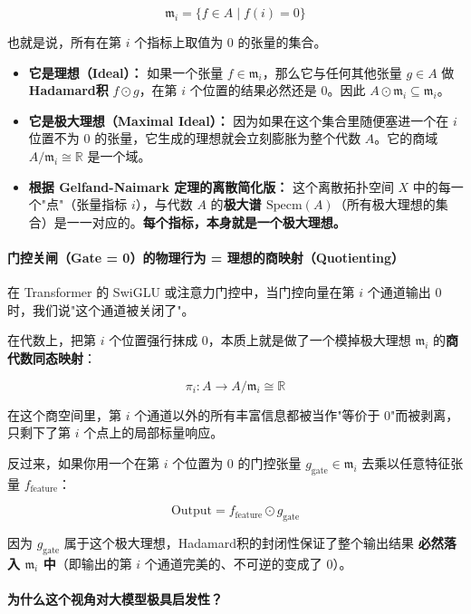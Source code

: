 \documentclass[10pt,a4paper]{article}
\begin{document}
\[
\mathfrak{m}_i = \{ f \in A \mid f(i) = 0 \}
\]

也就是说，所有在第 $i$ 个指标上取值为 $0$ 的张量的集合。

\begin{itemize}
\item \textbf{它是理想（Ideal）：} 如果一个张量 $f \in \mathfrak{m}_i$，那么它与任何其他张量 $g \in A$ 做 \textbf{Hadamard积} $f \odot g$，在第 $i$ 个位置的结果必然还是 $0$。因此 $A \odot \mathfrak{m}_i \subseteq \mathfrak{m}_i$。
\item \textbf{它是极大理想（Maximal Ideal）：} 因为如果在这个集合里随便塞进一个在 $i$ 位置不为 $0$ 的张量，它生成的理想就会立刻膨胀为整个代数 $A$。它的商域 $A / \mathfrak{m}_i \cong \mathbb{R}$ 是一个域。
\item \textbf{根据 Gelfand-Naimark 定理的离散简化版：} 这个离散拓扑空间 $X$ 中的每一个"点"（张量指标 $i$），与代数 $A$ 的\textbf{极大谱 $\text{Specm}(A)$}（所有极大理想的集合）是一一对应的\cite{GelfandNaimark1943,Gelfand1941}。\textbf{每个指标，本身就是一个极大理想。}
\end{itemize}

\paragraph{门控关闸（Gate = 0）的物理行为 = 理想的商映射（Quotienting）}

在 Transformer 的 SwiGLU 或注意力门控中，当门控向量在第 $i$ 个通道输出 $0$ 时，我们说"这个通道被关闭了"。

在代数上，把第 $i$ 个位置强行抹成 $0$，本质上就是做了一个模掉极大理想 $\mathfrak{m}_i$ 的\textbf{商代数同态映射}：

\[
\pi_i: A \to A / \mathfrak{m}_i \cong \mathbb{R}
\]

在这个商空间里，第 $i$ 个通道以外的所有丰富信息都被当作"等价于 0"而被剥离，只剩下了第 $i$ 个点上的局部标量响应。

反过来，如果你用一个在第 $i$ 个位置为 $0$ 的门控张量 $g_{\text{gate}} \in \mathfrak{m}_i$ 去乘以任意特征张量 $f_{\text{feature}}$：

\[
\text{Output} = f_{\text{feature}} \odot g_{\text{gate}}
\]

因为 $g_{\text{gate}}$ 属于这个极大理想，Hadamard积的封闭性保证了整个输出结果 \textbf{必然落入 $\mathfrak{m}_i$ 中}（即输出的第 $i$ 个通道完美的、不可逆的变成了 $0$）。

\paragraph{为什么这个视角对大模型极具启发性？}
\end{document}
